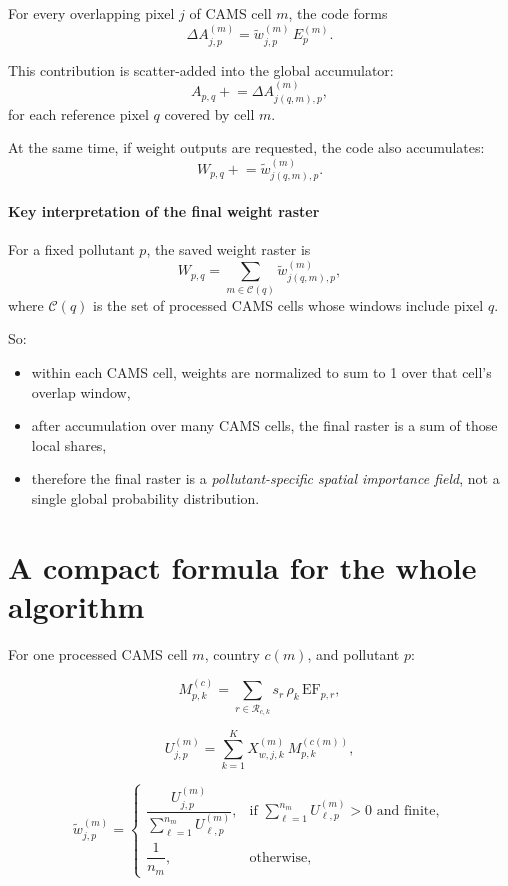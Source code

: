 \documentclass[11pt,a4paper]{article}
\begin{document}
For every overlapping pixel $j$ of CAMS cell $m$, the code forms
\[
\Delta A^{(m)}_{j,p} = \widetilde{w}^{(m)}_{j,p} \, E_p^{(m)}.
\]

This contribution is scatter-added into the global accumulator:
\[
A_{p,q} \mathrel{+}= \Delta A^{(m)}_{j(q,m),p},
\]
for each reference pixel $q$ covered by cell $m$.

At the same time, if weight outputs are requested, the code also accumulates:
\[
W_{p,q} \mathrel{+}= \widetilde{w}^{(m)}_{j(q,m),p}.
\]

\paragraph{Key interpretation of the final weight raster}
For a fixed pollutant $p$, the saved weight raster is
\[
W_{p,q} = \sum_{m \in \mathcal{C}(q)} \widetilde{w}^{(m)}_{j(q,m),p},
\]
where $\mathcal{C}(q)$ is the set of processed CAMS cells whose windows include pixel $q$.

So:

\begin{itemize}[leftmargin=1.4em]
  \item within each CAMS cell, weights are normalized to sum to 1 over that cell's overlap window,
  \item after accumulation over many CAMS cells, the final raster is a sum of those local shares,
  \item therefore the final raster is a \emph{pollutant-specific spatial importance field}, not a
  single global probability distribution.
\end{itemize}

\section{A compact formula for the whole algorithm}

For one processed CAMS cell $m$, country $c(m)$, and pollutant $p$:

\[
M^{(c)}_{p,k}
=
\sum_{r \in \mathcal{R}_{c,k}}
s_r \, \rho_k \, \mathrm{EF}_{p,r},
\]

\[
U^{(m)}_{j,p}
=
\sum_{k=1}^{K}
X^{(m)}_{w,j,k} \, M^{(c(m))}_{p,k},
\]

\[
\widetilde{w}^{(m)}_{j,p}
=
\begin{cases}
\dfrac{U^{(m)}_{j,p}}{\sum_{\ell=1}^{n_m} U^{(m)}_{\ell,p}},
& \text{if } \sum_{\ell=1}^{n_m} U^{(m)}_{\ell,p} > 0 \text{ and finite},\\[1.2em]
\dfrac{1}{n_m},
& \text{otherwise},
\end{cases}
\]
\end{document}
